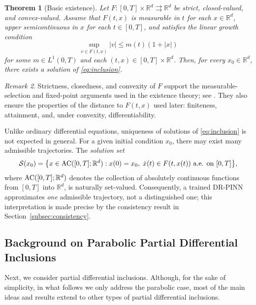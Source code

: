 \documentclass[11pt]{elsarticle}
\newtheorem{theorem}{Theorem}[section]
\theoremstyle{definition}
\theoremstyle{remark}
\newtheorem{remark}[theorem]{Remark}
\numberwithin{equation}{section}
\begin{document}
	\begin{theorem}[Basic existence]\label{thm:existence}
		Let $F:[0,T]\times\mathbb{R}^d\rightrightarrows\mathbb{R}^d$ be
		strict, closed-valued, and convex-valued. 
		Assume that $F(t,x)$ is measurable in $t$ for each $x\in\mathbb{R}^d$,
		upper semicontinuous in $x$ for each $t\in[0,T]$,
		and satisfies the linear growth condition
		\begin{equation} \label{eq:existence-growth}
		\sup_{v\in F(t,x)}|v|\le m(t)(1+|x|)
		\end{equation}
		for some $m\in L^1(0,T)$ and each $(t,x)\in [0,T]\times \mathbb{R}^d$.  Then, for every $x_0\in\mathbb{R}^d$, there
		exists a solution of \eqref{eq:inclusion}.
	\end{theorem}
	
	\begin{remark}
		Strictness, closedness, and convexity of $F$ support the measu\-rable-selection
		and fixed-point arguments used in the existence theory; see
		\cite{aubin_cellina_1984,aubin_frankowska_2009,deimling_1992}. They also
		ensure the properties of the distance to $F(t,x)$ used later: finiteness,
		attainment, and, under convexity, differentiability.
	\end{remark}
	
	Unlike ordinary differential equations, uniqueness of solutions of
	\eqref{eq:inclusion} is not expected in general.  For a given initial
	condition $x_0$, there may exist many admissible trajectories.  The
	\emph{solution set}
	\begin{equation}\label{eq:solution-DI}
		\mathcal{S}(x_0)
		=
		\bigl\{
		x\in {\rm AC}([0,T];\mathbb{R}^d):
		x(0)=x_0,\;
		\dot{x}(t)\in F(t,x(t))\ \text{a.e. on } [0,T]
		\bigr\},
	\end{equation}
	where ${\rm AC}([0,T];\mathbb{R}^d)$ denotes the collection of
	absolutely continuous functions from $[0,T]$ into $\mathbb{R}^d$,
	is naturally set-valued.  Consequently, a trained DR-PINN approximates
	\emph{one} admissible trajectory, not a distinguished one; this
	interpretation is made precise by the consistency result in
	Section~\ref{subsec:consistency}.
	
\subsection{Background on Parabolic Partial Differential Inclusions} \label{sec:basicsPDI}

Next, we consider partial differential inclusions. Although, for the sake of simplicity, in what follows we only address the parabolic case, most of the main ideas and results extend to other types of partial differential inclusions. 
\end{document}
